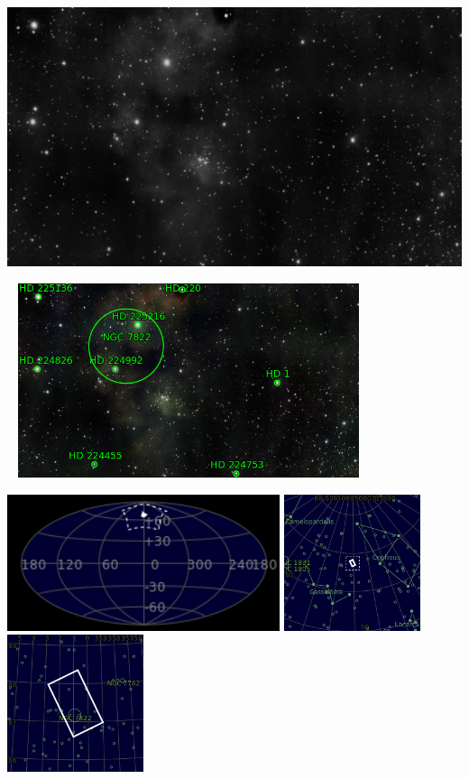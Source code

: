 \includegraphics[width=\textwidth]{../Imaging//Grayscale/HD225526.jpg}
\begin{center}
 \ \newpage
\includegraphics[width=0.75\textwidth]{../Imaging//Annotated/HD225526_Annotated.jpg}

\includegraphics[height=4cm]{../Imaging//Annotated/HD225526_Globe.jpg}
\includegraphics[height=4cm]{../Imaging//Annotated/HD225526_Close.jpg}
\includegraphics[height=4cm]{../Imaging//Annotated/HD225526_Closer.jpg}
\end{center}
